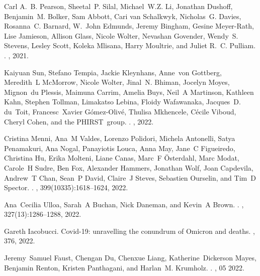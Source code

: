 \documentclass[12pt]{article}
\begin{document}
\begin{thebibliography}{10}
Carl A.~B. Pearson, Sheetal~P. Silal, Michael~W.Z. Li, Jonathan Dushoff,
  Benjamin~M. Bolker, Sam Abbott, Cari van Schalkwyk, Nicholas~G. Davies,
  Rosanna~C. Barnard, W.~John Edmunds, Jeremy Bingham, Gesine Meyer-Rath, Lise
  Jamieson, Allison Glass, Nicole Wolter, Nevashan Govender, Wendy~S. Stevens,
  Lesley Scott, Koleka Mlisana, Harry Moultrie, and Juliet R.~C. Pulliam.
.
, 2021.

Kaiyuan Sun, Stefano Tempia, Jackie Kleynhans, Anne~von Gottberg, Meredith~L
  McMorrow, Nicole Wolter, Jinal~N. Bhiman, Jocelyn Moyes, Mignon~du Plessis,
  Maimuna Carrim, Amelia Buys, Neil~A Martinson, Kathleen Kahn, Stephen
  Tollman, Limakatso Lebina, Floidy Wafawanaka, Jacques~D. du~Toit,
  Francesc~Xavier G{\'o}mez-Oliv{\'e}, Thulisa Mkhencele, C{\'e}cile Viboud,
  Cheryl Cohen, and the PHIRST~group.
.
, 2022.

Cristina Menni, Ana~M Valdes, Lorenzo Polidori, Michela Antonelli, Satya
  Penamakuri, Ana Nogal, Panayiotis Louca, Anna May, Jane~C Figueiredo,
  Christina Hu, Erika Molteni, Liane Canas, Marc~F Österdahl, Marc Modat,
  Carole~H Sudre, Ben Fox, Alexander Hammers, Jonathan Wolf, Joan Capdevila,
  Andrew~T Chan, Sean~P David, Claire~J Steves, Sebastien Ourselin, and Tim~D
  Spector.
.
, 399(10335):1618--1624, 2022.

Ana~Cecilia Ulloa, Sarah~A Buchan, Nick Daneman, and Kevin~A Brown.
.
, 327(13):1286--1288, 2022.

Gareth Iacobucci.
\newblock Covid-19: unravelling the conundrum of {Omicron} and deaths.
, 376, 2022.

Jeremy~Samuel Faust, Chengan Du, Chenxue Liang, Katherine~Dickerson Mayes,
  Benjamin Renton, Kristen Panthagani, and Harlan~M. Krumholz.
.
, 05 2022.


\end{thebibliography}
\end{document}
